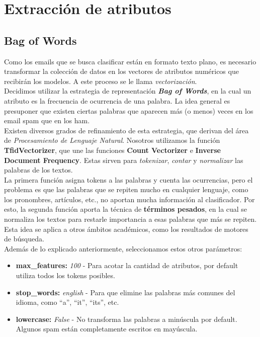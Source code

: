 \section{Extracción de atributos}
\subsection{Bag of Words}
Como los emails que se busca clasificar están en formato texto plano, es necesario transformar la colección de datos en los vectores de atributos numéricos que recibirán los modelos. A este proceso se le llama \textit{vectorización}.\\

Decidimos utilizar la estrategia de representación \textbf{\textit{Bag of Words}}, en la cual un atributo es la frecuencia de ocurrencia de una palabra. La idea general es presuponer que existen ciertas palabras que aparecen más (o menos) veces en los email spam que en los ham. \\

Existen diversos grados de refinamiento de esta estrategia, que derivan del área de \textit{Procesamiento de Lenguaje Natural}. Nosotros utilizamos la función \textbf{TfidVectorizer}, que une las funciones \textbf{Count Vectorizer} e \textbf{Inverse Document Frequency}. Estas sirven para \textit{tokenizar}, \textit{contar} y \textit{normalizar} las palabras de los textos.\\

La primera función asigna tokens a las palabras y cuenta las ocurrencias, pero el problema es que las palabras que se repiten mucho en cualquier lenguaje, como los pronombres, artículos, etc., no aportan mucha información al clasificador. Por esto, la segunda función aporta la técnica de \textbf{términos pesados}, en la cual se normaliza los textos para restarle importancia a esas palabras que más se repiten. Esta idea se aplica a otros ámbitos académicos, como los resultados de motores de búsqueda.\\

Además de lo explicado anteriormente, seleccionamos estos otros parámetros:
\begin{itemize}
\item \textbf{max\_features:} \textit{100} - Para acotar la cantidad de atributos, por default utiliza todos los tokens posibles.
\item \textbf{stop\_words:} \textit{english} - Para que elimine las palabras más comunes del idioma, como ``a'', ``it'', ``its'', etc.
\item \textbf{lowercase:} \textit{False} - No transforma las palabras a minúscula por default. Algunos spam están completamente escritos en mayúscula.
\end{itemize} 

